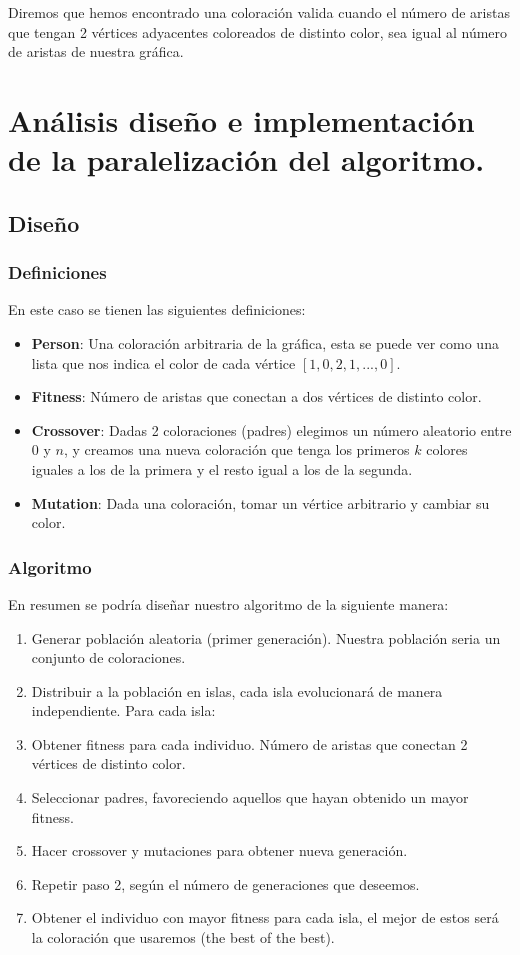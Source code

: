 \documentclass{article}
\begin{document}
\cite{M. Hindi and V.Yampolskiy, 2011}

Diremos que hemos encontrado una coloración valida cuando el número de aristas que tengan 2 vértices adyacentes coloreados de distinto color, sea igual al número de aristas de nuestra gráfica.

\newpage 
\section{Análisis diseño e implementación de la paralelización del algoritmo.}
\subsection{Diseño}
\subsubsection{Definiciones}
En este caso se tienen las siguientes definiciones:
\begin{itemize}
    \item \textbf{Person}: Una coloración arbitraria de la gráfica, esta se puede ver como una lista que nos indica el color de cada vértice $[1,0,2,1,...,0]$.
    \item \textbf{Fitness}: Número de aristas que conectan a dos vértices de distinto color.
    \item \textbf{Crossover}: Dadas 2 coloraciones (padres) elegimos un número aleatorio entre $0$ y $n$, y creamos una nueva coloración que tenga los primeros $k$ colores iguales a los de la primera y el resto igual a los de la segunda.
    \item\textbf{Mutation}: Dada una coloración, tomar un vértice arbitrario y cambiar su color.
\end{itemize}

\subsubsection{Algoritmo}
En resumen se podría diseñar nuestro algoritmo de la siguiente manera:
\begin{enumerate}
    \item Generar población aleatoria (primer generación). Nuestra población seria un conjunto de coloraciones.
    \item Distribuir a la población en islas, cada isla evolucionará de manera independiente. Para cada isla:
    \item Obtener fitness para cada individuo. Número de aristas que conectan 2 vértices de distinto color.
    \item Seleccionar padres, favoreciendo aquellos que hayan obtenido un mayor fitness.
    \item Hacer crossover y mutaciones para obtener nueva generación.
    \item Repetir paso 2, según el número de generaciones que deseemos.
    \item Obtener el individuo con mayor fitness para cada isla, el mejor de estos será la coloración que usaremos (the best of the best).
\end{enumerate}
\end{document}
